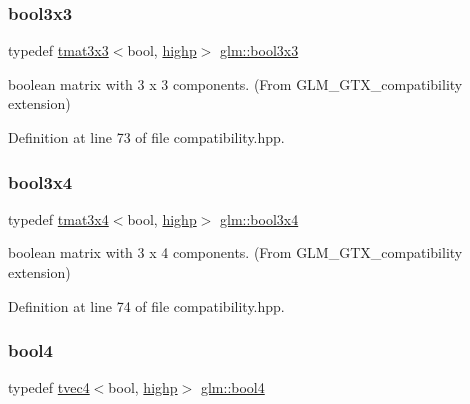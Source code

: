 \subsubsection{\texorpdfstring{bool3x3}{bool3x3}}
{\footnotesize\ttfamily typedef \mbox{\hyperlink{structglm_1_1tmat3x3}{tmat3x3}}$<$bool, \mbox{\hyperlink{namespaceglm_a0f04f086094c747d227af4425893f545ac6f7eab42eacbb10d59a58e95e362074}{highp}}$>$ \mbox{\hyperlink{group__gtx__compatibility_ga5c0ded80422867674cd651ab2261f2a3}{glm\+::bool3x3}}}



boolean matrix with 3 x 3 components. (From G\+L\+M\+\_\+\+G\+T\+X\+\_\+compatibility extension) 



Definition at line 73 of file compatibility.\+hpp.

\mbox{\label{group__gtx__compatibility_gaf3777caf1e50112919be2939be05ae7e}} 
\subsubsection{\texorpdfstring{bool3x4}{bool3x4}}
{\footnotesize\ttfamily typedef \mbox{\hyperlink{structglm_1_1tmat3x4}{tmat3x4}}$<$bool, \mbox{\hyperlink{namespaceglm_a0f04f086094c747d227af4425893f545ac6f7eab42eacbb10d59a58e95e362074}{highp}}$>$ \mbox{\hyperlink{group__gtx__compatibility_gaf3777caf1e50112919be2939be05ae7e}{glm\+::bool3x4}}}



boolean matrix with 3 x 4 components. (From G\+L\+M\+\_\+\+G\+T\+X\+\_\+compatibility extension) 



Definition at line 74 of file compatibility.\+hpp.

\mbox{\label{group__gtx__compatibility_ga141861edebf999f94938944f0fb0777a}} 
\subsubsection{\texorpdfstring{bool4}{bool4}}
{\footnotesize\ttfamily typedef \mbox{\hyperlink{structglm_1_1tvec4}{tvec4}}$<$bool, \mbox{\hyperlink{namespaceglm_a0f04f086094c747d227af4425893f545ac6f7eab42eacbb10d59a58e95e362074}{highp}}$>$ \mbox{\hyperlink{group__gtx__compatibility_ga141861edebf999f94938944f0fb0777a}{glm\+::bool4}}}



